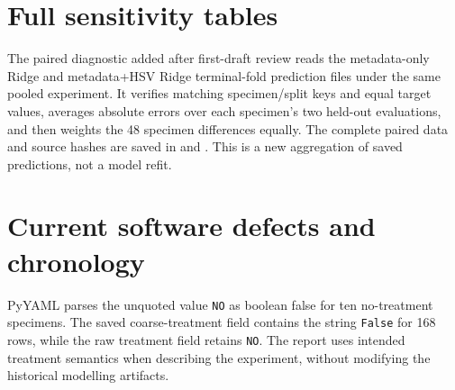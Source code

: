 \section{Full sensitivity tables}
\begin{table}[htbp]\centering\small
\caption[Complete post-onset sensitivity results]{Selected post-onset configurations for 43 terminal specimens over ten grouped folds. MAE and sample SD are in kN; other columns are mean fold metrics. Input/model selection is exploratory and shares the evaluation folds.}\label{tab:postfull}

\end{table}
\begin{table}[htbp]\centering\footnotesize
\caption[Complete within-mesh results]{All selected within-mesh feature families, with 24 terminal specimens per mesh group and ten grouped folds per analysis. MAE is in kN. Every row has negative mean test $R^2$; Spearman varies and is not uniformly null. Model choices differ by feature family.}\label{tab:meshfull}

\end{table}
\FloatBarrier

The paired diagnostic added after first-draft review reads the metadata-only Ridge and metadata+HSV Ridge terminal-fold prediction files under the same pooled experiment. It verifies matching specimen/split keys and equal target values, averages absolute errors over each specimen's two held-out evaluations, and then weights the 48 specimen differences equally. The complete paired data and source hashes are saved in  and . This is a new aggregation of saved predictions, not a model refit.

\begin{table}[htbp]\centering
\caption[Threshold counts for model-derived wire loss]{Threshold status of model-derived wire-area-loss trajectories for 48 specimens per threshold. Values are counts, not measured failures. Thresholds are fractions expressed here as percentages. ``Not crossed'' means within the configured 365-day projection horizon; the term does not imply a validated survival observation. Future crossing count is zero at all thresholds.}\label{tab:thresholds}

\end{table}
\FloatBarrier
\section{Current software defects and chronology}
PyYAML parses the unquoted value \texttt{NO} as boolean false for ten no-treatment specimens. The saved coarse-treatment field contains the string \texttt{False} for 168 rows, while the raw treatment field retains \texttt{NO}. The report uses intended treatment semantics when describing the experiment, without modifying the historical modelling artifacts.

